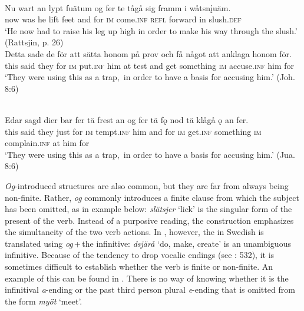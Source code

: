 \documentclass[output=paper]{langscibook}
\begin{document}
\ex {}\\\label{ex:kalm:15b}
\gll Nu wart an lypt fuätum og fer te tågå sig framm i wåtsn\k{i}uäm.\\
now was he lift feet and for \textsc{im} come.\textsc{inf} \textsc{refl} forward in slush.\textsc{def}\\
\glt ‘He now had to raise his leg up high in order to make his way through the slush.’ (Rattsjin, p. 26)
\z 
\ex
\label{ex:kalm:16}
\ea {}\\\label{ex:kalm:16a}
\gll Detta sade de för att sätta honom på prov och få något att anklaga honom för.\\
this said they for \textsc{im} put.\textsc{inf} him at test and get something \textsc{im} accuse.\textsc{inf} him for\\
\glt ‘They were using this  as a trap,{~}in order to have a basis for accusing him.’ (Joh. 8:6)

\ex {}\\\label{ex:kalm:16b}
\gll Edar sagd dier bar fer tä frest an og fer tä fǫ nod tä klågå ǫ an fer.\\
this said they just for \textsc{im} tempt.\textsc{inf} him and for \textsc{im} get.\textsc{inf} something \textsc{im} complain.\textsc{inf} at him for\\
\glt ‘They were using this  as a trap,{~}in order to have a basis for accusing him.’ (Jua. 8:6)
\z 
\z 

\textit{Og}-introduced structures are also common, but they are far from always being non-finite. Rather, \textit{og} commonly introduces a finite clause from which the subject has been omitted, as in example  below: \textit{slätsjer} ‘lick’ is the singular form of the present  of the verb. Instead of a purposive reading, the construction emphasizes the simultaneity of the two verb actions. In , however, the  in Swedish is translated using \textit{og}\,+\,the infinitive: \textit{dsjärå} ‘do, make, create’ is an unambiguous infinitive. Because of the  tendency to drop vocalic endings (see \citealt{AkerbergNystrom2012}: 532), it is sometimes difficult to establish whether the verb is finite or non-finite. An example of this can be found in . There is no way of knowing whether it is the infinitival \textit{a}{}-ending or the past  third person plural \textit{e}{}-ending that is omitted from the form \textit{myöt} ‘meet’. 
\end{document}
